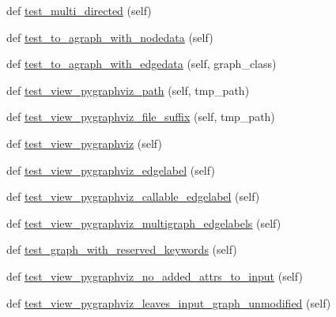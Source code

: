 \begin{DoxyCompactItemize}
\item 
def \hyperlink{classnetworkx_1_1drawing_1_1tests_1_1test__agraph_1_1TestAGraph_a7ef4703e829b9021da49a05581af08af}{test\+\_\+multi\+\_\+directed} (self)
\item 
def \hyperlink{classnetworkx_1_1drawing_1_1tests_1_1test__agraph_1_1TestAGraph_a5fc6ffd65e88075dccf42a5633231d09}{test\+\_\+to\+\_\+agraph\+\_\+with\+\_\+nodedata} (self)
\item 
def \hyperlink{classnetworkx_1_1drawing_1_1tests_1_1test__agraph_1_1TestAGraph_ac585fa5dba0d25514c15646019e60b8a}{test\+\_\+to\+\_\+agraph\+\_\+with\+\_\+edgedata} (self, graph\+\_\+class)
\item 
def \hyperlink{classnetworkx_1_1drawing_1_1tests_1_1test__agraph_1_1TestAGraph_ad26fb8648cfde08b0e5c17709c45ff9c}{test\+\_\+view\+\_\+pygraphviz\+\_\+path} (self, tmp\+\_\+path)
\item 
def \hyperlink{classnetworkx_1_1drawing_1_1tests_1_1test__agraph_1_1TestAGraph_a73a19031bab97f4e5189b721c8b5097d}{test\+\_\+view\+\_\+pygraphviz\+\_\+file\+\_\+suffix} (self, tmp\+\_\+path)
\item 
def \hyperlink{classnetworkx_1_1drawing_1_1tests_1_1test__agraph_1_1TestAGraph_a9012155285c7d38ced4225ba02b4ddf0}{test\+\_\+view\+\_\+pygraphviz} (self)
\item 
def \hyperlink{classnetworkx_1_1drawing_1_1tests_1_1test__agraph_1_1TestAGraph_a8d0dca2654f41b8f70dbbca82e88206e}{test\+\_\+view\+\_\+pygraphviz\+\_\+edgelabel} (self)
\item 
def \hyperlink{classnetworkx_1_1drawing_1_1tests_1_1test__agraph_1_1TestAGraph_a967d4d7fa632e60d2595102a9c8ed9fa}{test\+\_\+view\+\_\+pygraphviz\+\_\+callable\+\_\+edgelabel} (self)
\item 
def \hyperlink{classnetworkx_1_1drawing_1_1tests_1_1test__agraph_1_1TestAGraph_a87ad68348c297d5dd28183215c224dd7}{test\+\_\+view\+\_\+pygraphviz\+\_\+multigraph\+\_\+edgelabels} (self)
\item 
def \hyperlink{classnetworkx_1_1drawing_1_1tests_1_1test__agraph_1_1TestAGraph_ab503ed403b614c42de489ee052f3660b}{test\+\_\+graph\+\_\+with\+\_\+reserved\+\_\+keywords} (self)
\item 
def \hyperlink{classnetworkx_1_1drawing_1_1tests_1_1test__agraph_1_1TestAGraph_afa0078f86be4c74e974bf4b1c0ee5b7f}{test\+\_\+view\+\_\+pygraphviz\+\_\+no\+\_\+added\+\_\+attrs\+\_\+to\+\_\+input} (self)
\item 
def \hyperlink{classnetworkx_1_1drawing_1_1tests_1_1test__agraph_1_1TestAGraph_acf9753e58a6910a88bad88d5326ce08b}{test\+\_\+view\+\_\+pygraphviz\+\_\+leaves\+\_\+input\+\_\+graph\+\_\+unmodified} (self)

\end{DoxyCompactItemize}
